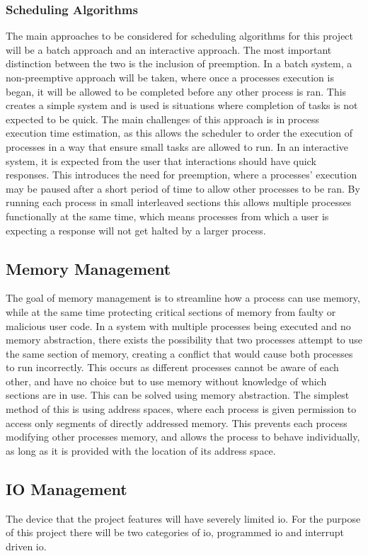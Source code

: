 \subsubsection{Scheduling Algorithms}
The main approaches to be considered for scheduling algorithms for this project will be a batch approach and an interactive approach. The most important distinction between the two is the inclusion of preemption. In a batch system, a non-preemptive approach will be taken, where once a processes execution is began, it will be allowed to be completed before any other process is ran. This creates a simple system and is used is situations where completion of tasks is not expected to be quick. The main challenges of this approach is in process execution time estimation, as this allows the scheduler to order the execution of processes in a way that ensure small tasks are allowed to run. In an interactive system, it is expected from the user that interactions should have quick responses. This introduces the need for preemption, where a processes' execution may be paused after a short period of time to allow other processes to be ran. By running each process in small interleaved sections this allows multiple processes functionally at the same time, which means processes from which a user is expecting a response will not get halted by a larger process.\cite{modern_operating}
\subsection{Memory Management}
The goal of memory management is to streamline how a process can use memory, while at the same time protecting critical sections of memory from faulty or malicious user code. In a system with multiple processes being executed and no memory abstraction, there exists the possibility that two processes attempt to use the same section of memory, creating a conflict that would cause both processes to run incorrectly. This occurs as different processes cannot be aware of each other, and have no choice but to use memory without knowledge of which sections are in use. This can be solved using memory abstraction. The simplest method of this is using address spaces, where each process is given permission to access only segments of directly addressed memory. This prevents each process modifying other processes memory, and allows the process to behave individually, as long as it is provided with the location of its address space.\cite{modern_operating}
\subsection{IO Management}
The device that the project features will have severely limited \ac{io}. For the purpose of this project there will be two categories of \ac{io}, programmed \ac{io} and interrupt driven \ac{io}. 

